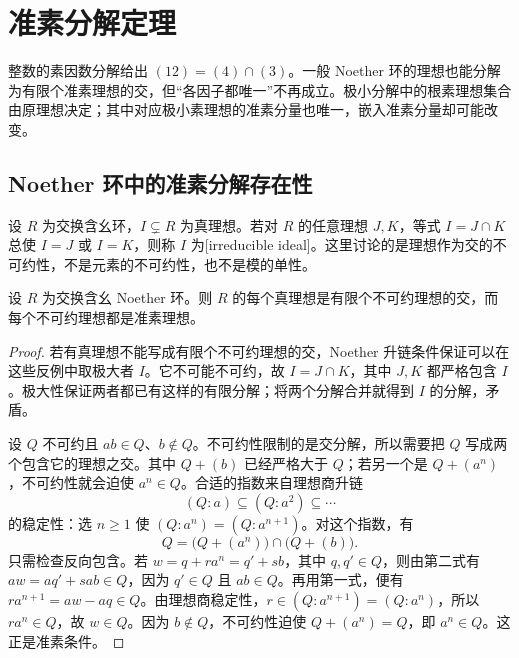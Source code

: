 
\section{准素分解定理}
\label{b3:sec:0403}

整数的素因数分解给出 \((12)=(4)\cap(3)\)。一般 Noether 环的理想也能分解为有限个准素理想的交，但“各因子都唯一”不再成立。极小分解中的根素理想集合由原理想决定；其中对应极小素理想的准素分量也唯一，嵌入准素分量却可能改变。

\subsection{Noether 环中的准素分解存在性}
\label{b3:subsec:0403:01}

设 \(R\) 为交换含幺环，\(I\subsetneq R\) 为真理想。若对 \(R\) 的任意理想 \(J,K\)，等式 \(I=J\cap K\) 总使 \(I=J\) 或 \(I=K\)，则称 \(I\) 为[irreducible ideal]。这里讨论的是理想作为交的不可约性，不是元素的不可约性，也不是模的单性。

\begin{lemma}\label{b3:lem:irreducible-ideal-primary}
	设 \(R\) 为交换含幺 Noether 环。则 \(R\) 的每个真理想是有限个不可约理想的交，而每个不可约理想都是准素理想。
\end{lemma}
\begin{proof}
	若有真理想不能写成有限个不可约理想的交，Noether 升链条件保证可以在这些反例中取极大者 \(I\)。它不可能不可约，故 \(I=J\cap K\)，其中 \(J,K\) 都严格包含 \(I\)。极大性保证两者都已有这样的有限分解；将两个分解合并就得到 \(I\) 的分解，矛盾。

	设 \(Q\) 不可约且 \(ab\in Q\)、\(b\notin Q\)。不可约性限制的是交分解，所以需要把 \(Q\) 写成两个包含它的理想之交。其中 \(Q+(b)\) 已经严格大于 \(Q\)；若另一个是 \(Q+(a^n)\)，不可约性就会迫使 \(a^n\in Q\)。合适的指数来自理想商升链
	\[
		(Q:a)\subseteq(Q:a^2)\subseteq\cdots
	\]
	的稳定性：选 \(n\ge1\) 使 \((Q:a^n)=(Q:a^{n+1})\)。对这个指数，有
	\[
		Q=\bigl(Q+(a^n)\bigr)\cap\bigl(Q+(b)\bigr).
	\]
	只需检查反向包含。若 \(w=q+ra^n=q'+sb\)，其中 \(q,q'\in Q\)，则由第二式有 \(aw=aq'+sab\in Q\)，因为 \(q'\in Q\) 且 \(ab\in Q\)。再用第一式，便有 \(ra^{n+1}=aw-aq\in Q\)。由理想商稳定性，\(r\in(Q:a^{n+1})=(Q:a^n)\)，所以 \(ra^n\in Q\)，故 \(w\in Q\)。因为 \(b\notin Q\)，不可约性迫使 \(Q+(a^n)=Q\)，即 \(a^n\in Q\)。这正是准素条件。
\end{proof}

